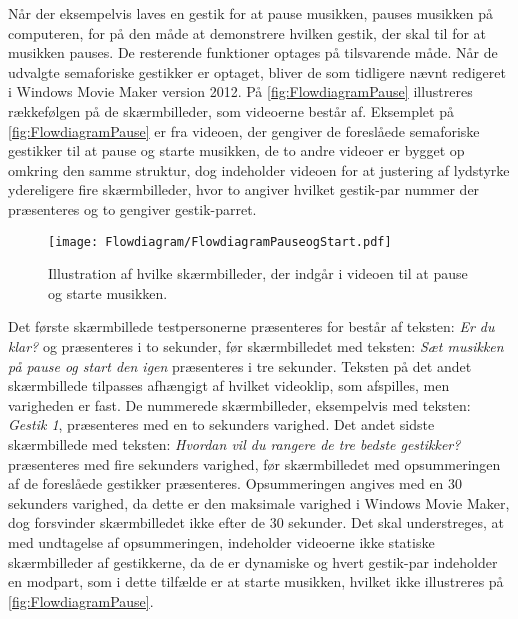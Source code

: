 Når der eksempelvis laves en gestik for at pause musikken, pauses musikken på computeren, for på den måde at demonstrere hvilken gestik, der skal til for at musikken pauses. De resterende funktioner optages på tilsvarende måde.\blankline
%
Når de udvalgte semaforiske gestikker er optaget, bliver de som tidligere nævnt redigeret i Windows Movie Maker version 2012. På \autoref{fig:FlowdiagramPause} illustreres rækkefølgen på de skærmbilleder, som videoerne består af. Eksemplet på \autoref{fig:FlowdiagramPause} er fra videoen, der gengiver de foreslåede semaforiske gestikker til at pause og starte musikken, de to andre videoer er bygget op omkring den samme struktur, dog indeholder videoen for at justering af lydstyrke ydereligere fire skærmbilleder, hvor to angiver hvilket gestik-par nummer der præsenteres og to gengiver gestik-parret.       
%
\begin{figure}[H]
	\centering
	\texttt{[image: Flowdiagram/FlowdiagramPauseogStart.pdf]}
	\caption{Illustration af hvilke skærmbilleder, der indgår i videoen til at pause og starte musikken.}
	\label{fig:FlowdiagramPause}
\end{figure}
\noindent
%
Det første skærmbillede testpersonerne præsenteres for består af teksten: \textit{Er du klar?} og præsenteres i to sekunder, før skærmbilledet med teksten: \textit{Sæt musikken på pause og start den igen} præsenteres i tre sekunder. Teksten på det andet skærmbillede tilpasses afhængigt af hvilket videoklip, som afspilles, men varigheden er fast. De nummerede skærmbilleder, eksempelvis med teksten: \textit{Gestik 1}, præsenteres med en to sekunders varighed. Det andet sidste skærmbillede med teksten: \textit{Hvordan vil du rangere de tre bedste gestikker?} præsenteres med fire sekunders varighed, før skærmbilledet med opsummeringen af de foreslåede gestikker præsenteres. Opsummeringen angives med en 30 sekunders varighed, da dette er den maksimale varighed i Windows Movie Maker, dog forsvinder skærmbilledet ikke efter de 30 sekunder. Det skal understreges, at med undtagelse af opsummeringen, indeholder videoerne ikke statiske skærmbilleder af gestikkerne, da de er dynamiske og hvert gestik-par indeholder en modpart, som i dette tilfælde er at starte musikken, hvilket ikke illustreres på \autoref{fig:FlowdiagramPause}.

